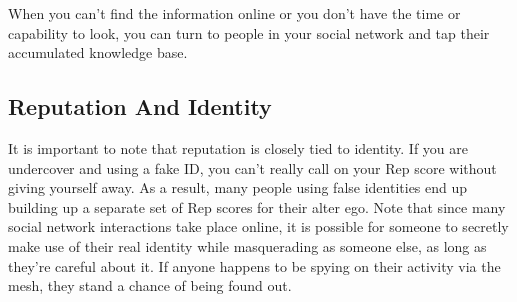 When you can't find the information online or you don't have the time or capability to look, you can turn to people in your social network and tap their accumulated knowledge base. 

\subsection{Reputation And Identity} 

It is important to note that reputation is closely tied to identity. If you are undercover and using a fake ID, you can't really call on your Rep score without giving yourself away. As a result, many people using false identities end up building up a separate set of Rep scores for their alter ego. Note that since many social network interactions take place online, it is possible for someone to secretly make use of their real identity while masquerading as someone else, as long as they're careful about it. If anyone happens to be spying on their activity via the mesh, they stand a chance of being found out. 



